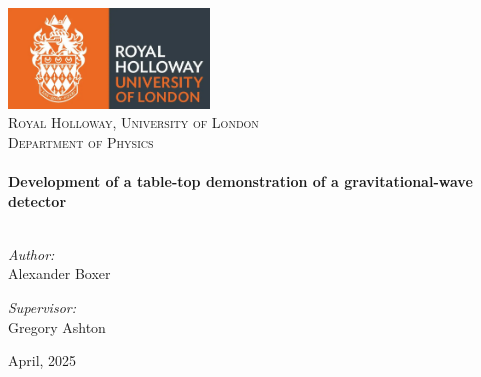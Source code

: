 
\begin{titlepage}

\vbox{ }

\vbox{ }

\begin{center}

\includegraphics[width=0.4\textwidth]{images/logo.jpg}\\[1cm]
\textsc{\LARGE Royal Holloway, University of London}\\[1.5cm]
\textsc{\Large Department of Physics}\\[0.5cm]

\vbox{ }
\HRule \\[0.4cm]
{ \huge \bfseries Development of a table-top demonstration of a gravitational-wave detector}\\[0.4cm]
\HRule \\[1.5cm]
\begin{minipage}{0.4\textwidth}
\begin{flushleft} \large
\emph{Author:}\\
Alexander Boxer
\end{flushleft}
\end{minipage}
\begin{minipage}{0.4\textwidth}
\begin{flushright} \large
\emph{Supervisor:} \\
Gregory Ashton
\end{flushright}
\end{minipage}

\vfill
{\large April, 2025}
\end{center}
\end{titlepage}
\restoregeometry